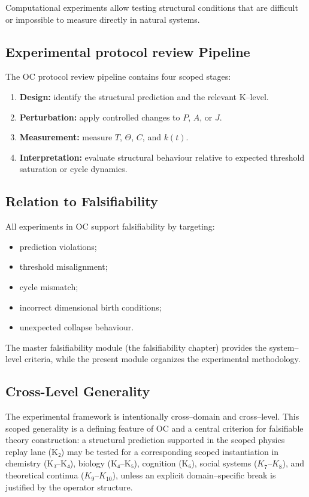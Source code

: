 Computational experiments allow testing structural conditions that are
difficult or impossible to measure directly in natural systems.


\subsection{Experimental protocol review Pipeline}

The OC protocol review pipeline contains four scoped stages:

\begin{enumerate}
    \item \textbf{Design:} identify the structural prediction and the relevant
          K–level.
    \item \textbf{Perturbation:} apply controlled changes to $P$, $A$, or $J$.
    \item \textbf{Measurement:} measure $T$, $\Theta$, $C$, and $k(t)$.
    \item \textbf{Interpretation:} evaluate structural behaviour relative to
          expected threshold saturation or cycle dynamics.
\end{enumerate}


\subsection{Relation to Falsifiability}

All experiments in OC support falsifiability by targeting:

\begin{itemize}
    \item prediction violations;
    \item threshold misalignment;
    \item cycle mismatch;
    \item incorrect dimensional birth conditions;
    \item unexpected collapse behaviour.
\end{itemize}

The master falsifiability module (the falsifiability chapter)
provides the system–level criteria, while the present module organizes the
experimental methodology.


\subsection{Cross-Level Generality}

The experimental framework is intentionally cross–domain and cross–level.
This scoped generality is a defining feature of OC and a central criterion for
falsifiable theory construction:
a structural prediction supported in the scoped physics replay lane (K₂) may be tested for a corresponding scoped instantiation in chemistry (K₃–K₄), biology (K₄–K₅), cognition (K₆), social
systems ($K_7$–$K_8$), and theoretical continua ($K_9$–$K_{10}$), unless an explicit
domain–specific break is justified by the operator structure.


